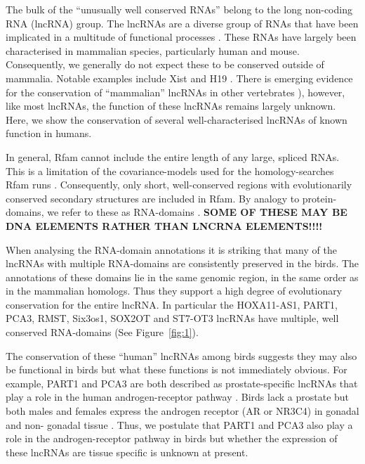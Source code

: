 \documentclass[10pt]{bmc_article}
\newenvironment{bmcformat}{\begin{raggedright}\baselineskip20pt\sloppy\setboolean{publ}{false}}{\end{raggedright}\baselineskip20pt\sloppy}
\begin{document}
\begin{bmcformat}
The bulk of the ``unusually well conserved RNAs'' belong to the long
non-coding RNA (lncRNA) group.  The lncRNAs are a diverse group of
RNAs that have been implicated in a multitude of functional processes
\cite{Rinn:2007,Chow:2005,Guttman:2009}. These RNAs have largely been
characterised in mammalian species, particularly human and
mouse. Consequently, we generally do not expect these to be conserved
outside of mammalia. Notable examples include Xist \cite{Duret:2006}
and H19 \cite{Smits:2008}.  There is emerging evidence for the
conservation of ``mammalian'' lncRNAs in other vertebrates
\cite{Chodroff:2010,Ulitsky:2011}), however, like most lncRNAs, the
function of these lncRNAs remains largely unknown. Here, we show the
conservation of several well-characterised lncRNAs of known function
in humans. 

In general, Rfam cannot include the entire length of any large,
spliced RNAs. This is a limitation of the covariance-models used for
the homology-searches Rfam runs \cite{Nawrocki:2009}. Consequently,
only short, well-conserved regions with evolutionarily conserved
secondary structures are included in Rfam. By analogy to
protein-domains, we refer to these as RNA-domains
\cite{Burge:2013}. {\bf SOME OF THESE MAY BE DNA ELEMENTS RATHER THAN
  LNCRNA ELEMENTS!!!!}

When analysing the RNA-domain annotations it is striking that many of
the lncRNAs with multiple RNA-domains are consistently preserved in
the birds. The annotations of these domains lie in the same genomic
region, in the same order as in the mammalian homologs. Thus they
support a high degree of evolutionary conservation for the entire
lncRNA. In particular the HOXA11-AS1, PART1, PCA3, RMST, Six3os1, SOX2OT and
ST7-OT3 lncRNAs have multiple, well conserved RNA-domains (See
Figure~\ref{fig:1}).

The conservation of these ``human'' lncRNAs among birds suggests they may 
also be functional in birds but what these
functions is not immediately obvious. For example, PART1 and
PCA3 are both described as prostate-specific lncRNAs that play a role
in the human androgen-receptor pathway
\cite{Bussemakers:1999,Lin:2000,Ferreira:2012}. Birds lack a prostate
but both males and females express the androgen receptor (AR or NR3C4) in gonadal
and non- gonadal tissue
\cite{Yoshimura:1993,Veney:2004,Fuxjager:2012,Leska:2012}. Thus, we
postulate that PART1 and PCA3 also play a role in the
androgen-receptor pathway in birds but whether the expression of these
lncRNAs are tissue specific is unknown at present.


\end{bmcformat}
\end{document}
